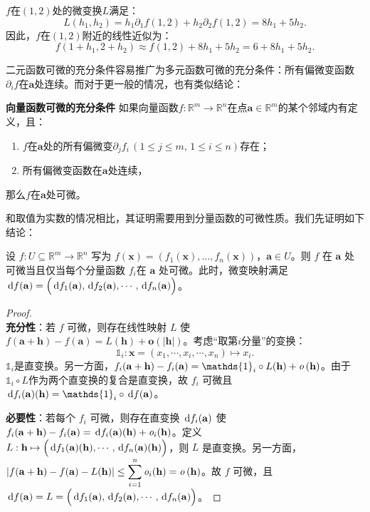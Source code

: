 \documentclass[12pt,UTF8]{ctexbook}
\begin{document}
\begin{appendix}
\begin{so}
$f$在$(1,2)$处的微变换$L$满足：
$$ L(h_1,h_2) = h_1\partial_1 f(1,2) + h_2\partial_2 f(1,2) = 8h_1 + 5h_2. $$
因此，$f$在$(1,2)$附近的线性近似为：
$$ f(1+h_1,2+h_2) \approx f(1,2) + 8h_1 + 5h_2 = 6 + 8h_1 + 5h_2. $$
\end{so}

二元函数可微的充分条件容易推广为多元函数可微的充分条件：所有偏微变函数$\partial_i f$在$\mathbf{a}$处连续。而对于更一般的情况，也有类似结论：
\begin{tm}{\textbf{向量函数可微的充分条件}}\label{tm:a-1-10}
如果向量函数$f:\mathbb{R}^m\rightarrow\mathbb{R}^n$在点$\mathbf{a}\in\mathbb{R}^m$的某个邻域内有定义，且：
\begin{enumerate}[label=\arabic*.]
\item $f$在$\mathbf{a}$处的所有偏微变$\partial_j f_i\,( 1\leqslant j\leqslant m,\,1\leqslant i\leqslant n)$存在；
\item 所有偏微变函数在$\mathbf{a}$处连续，
\end{enumerate}
那么$f$在$\mathbf{a}$处可微。
\end{tm}
和取值为实数的情况相比，其证明需要用到分量函数的可微性质。我们先证明如下结论：
\begin{tm}\label{tm:a-1-20}
    设 $f:U\subseteq\mathbb{R}^m\to\mathbb{R}^n$ 写为 $f(\mathbf{x}) = (f_1(\mathbf{x}),\dots,f_n(\mathbf{x}))$，$\mathbf{a}\in U$。则 $f$ 在 $\mathbf{a}$ 处可微当且仅当每个分量函数 $f_i$在 $\mathbf{a}$ 处可微。此时，微变映射满足 $\,\mathrm{d} f (\mathbf{a}) = \Big(\,\mathrm{d} f_1 (\mathbf{a}), \,\mathrm{d} f_2 (\mathbf{a}),\cdots,\,\mathrm{d} f_n (\mathbf{a})\Big)$。
\end{tm}
\begin{proof}
    \mbox{}\\
    \textbf{充分性}：若 $f$ 可微，则存在线性映射 $L$ 使 $f(\mathbf{a}+\mathbf{h})-f(\mathbf{a}) = L(\mathbf{h}) + \mathbf{o}(|\mathbf{h}|)$。考虑“取第$i$分量”的变换：
    $$ \mathds{1}_i : \mathbf{x} = (x_1, \cdots, x_i,\cdots, x_n) \mapsto x_i.$$
    $\mathds{1}_i$是直变换。另一方面，$f_i(\mathbf{a}+\mathbf{h})-f_i(\mathbf{a}) = \mathds{1}_i\circ L(\mathbf{h}) + \olim{\mathbf{h}}$。由于 $\mathds{1}_i\circ L$作为两个直变换的复合是直变换，故 $f_i$ 可微且 $\diff f_i(\mathbf{a})(\mathbf{h}) = \mathds{1}_i\circ \diff f(\mathbf{a})$。

    \noindent\textbf{必要性}：若每个 $f_i$ 可微，则存在直变换 $\,\mathrm{d} f_i (\mathbf{a})$ 使 $f_i(\mathbf{a}+\mathbf{h})-f_i(\mathbf{a}) = \,\mathrm{d} f_i (\mathbf{a})(\mathbf{h}) + \mathit{o}_i(\mathbf{h})$。定义 $L:\mathbf{h} \mapsto \Big(\,\mathrm{d} f_1 (\mathbf{a})(\mathbf{h}),\cdots,\,\mathrm{d} f_n (\mathbf{a})(\mathbf{h})\Big)$，则 $L$ 是直变换。另一方面， $\displaystyle |f(\mathbf{a}+\mathbf{h})-f(\mathbf{a})-L(\mathbf{h})| \le \sum_{i=1}^n \mathit{o}_i(\mathbf{h}) = \mathit{o}\left(\mathbf{h}\right)$。故 $f$ 可微，且$\,\mathrm{d} f (\mathbf{a}) = L = \Big(\,\mathrm{d} f_1 (\mathbf{a}), \,\mathrm{d} f_2 (\mathbf{a}),\cdots,\,\mathrm{d} f_n (\mathbf{a})\Big)$。
\end{proof}


\end{appendix}
\end{document}
